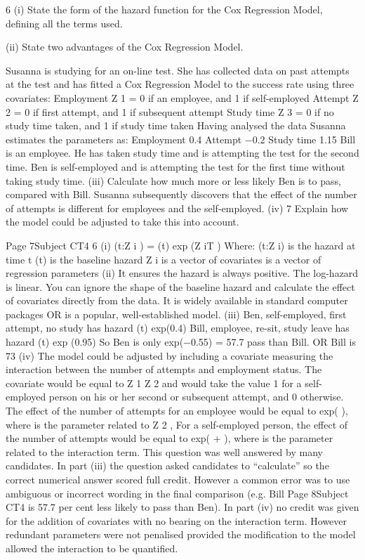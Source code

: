 \documentclass[a4paper,12pt]{article}
\begin{document}
6
(i) State the form of the hazard function for the Cox Regression Model, defining
all the terms used.

(ii) State two advantages of the Cox Regression Model.

Susanna is studying for an on-line test. She has collected data on past attempts at the
test and has fitted a Cox Regression Model to the success rate using three covariates:
Employment Z 1 = 0 if an employee, and 1 if self-employed
Attempt
Z 2 = 0 if first attempt, and 1 if subsequent attempt
Study time
Z 3 = 0 if no study time taken, and 1 if study time taken
Having analysed the data Susanna estimates the parameters as:
Employment 0.4
Attempt
−0.2
Study time
1.15
Bill is an employee. He has taken study time and is attempting the test for the second time. Ben is self-employed and is attempting the test for the first time without taking
study time.
(iii)
Calculate how much more or less likely Ben is to pass, compared with Bill. 
Susanna subsequently discovers that the effect of the number of attempts is different
for employees and the self-employed.
(iv)
7
Explain how the model could be adjusted to take this into account.


Page 7Subject CT4 %
6
(i)
\lambda(t:Z i ) =  (t) exp (\beta Z iT )
Where:
\lambda(t:Z i) is the hazard at time t
 (t) is the baseline hazard
Z i is a vector of covariates
\beta is a vector of regression parameters
(ii)
It ensures the hazard is always positive.
The log-hazard is linear.
You can ignore the shape of the baseline hazard and calculate the effect of covariates
directly from the data.
It is widely available in standard computer packages OR is a popular, well-established
model.
(iii)
Ben, self-employed, first attempt, no study has hazard  (t) exp(0.4)
Bill, employee, re-sit, study leave has hazard  (t) exp (0.95)
So Ben is only exp(−0.55) = 57.7%
pass than Bill.
OR
Bill is 73%
(iv)
The model could be adjusted by including a covariate measuring the interaction
between the number of attempts and employment status.
The covariate would be equal to Z 1 Z 2 and would take the value 1 for a self-employed
person on his or her second or subsequent attempt, and 0 otherwise.
The effect of the number of attempts for an employee would be equal to exp( ),
where  is the parameter related to Z 2 , For a self-employed person, the effect of the
number of attempts would be equal to exp( +  ), where  is the parameter related
to the interaction term.
This question was well answered by many candidates. In part (iii) the question asked
candidates to “calculate” so the correct numerical answer scored full credit. However a
common error was to use ambiguous or incorrect wording in the final comparison (e.g. Bill
Page 8Subject CT4 %
is 57.7 per cent less likely to pass than Ben). In part (iv) no credit was given for the addition
of covariates with no bearing on the interaction term. However redundant parameters were
not penalised provided the modification to the model allowed the interaction to be quantified.


\newpage
\end{document}

